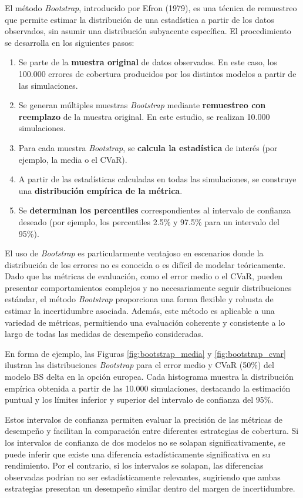 \documentclass[11pt,a4paper,spanish]{article}
\numberwithin{equation}{section} %
\begin{document}
El método \textit{Bootstrap}, introducido por Efron (1979), es una técnica de remuestreo que permite estimar la distribución de una estadística a partir de los datos observados, sin asumir una distribución subyacente específica. El procedimiento se desarrolla en los siguientes pasos:

\begin{enumerate}
    \item Se parte de la \textbf{muestra original} de datos observados. En este caso, los 100.000 errores de cobertura producidos por los distintos modelos a partir de las simulaciones. 
    \item  Se generan múltiples muestras \textit{Bootstrap} mediante \textbf{remuestreo con reemplazo} de la muestra original. En este estudio, se realizan 10.000 simulaciones.
    \item Para cada muestra \textit{Bootstrap}, se \textbf{calcula la estadística} de interés (por ejemplo, la media o el CVaR).
    \item A partir de las estadísticas calculadas en todas las simulaciones, se construye una \textbf{distribución empírica de la métrica}.
    \item Se \textbf{determinan los percentiles} correspondientes al intervalo de confianza deseado (por ejemplo, los percentiles 2.5\% y 97.5\% para un intervalo del 95\%).
\end{enumerate}

El uso de \textit{Bootstrap} es particularmente ventajoso en escenarios donde la distribución de los errores no es conocida o es difícil de modelar teóricamente. Dado que las métricas de evaluación, como el error medio o el CVaR, pueden presentar comportamientos complejos y no necesariamente seguir distribuciones estándar, el método \textit{Bootstrap} proporciona una forma flexible y robusta de estimar la incertidumbre asociada. Además, este método es aplicable a una variedad de métricas, permitiendo una evaluación coherente y consistente a lo largo de todas las medidas de desempeño consideradas.

En forma de ejemplo, las Figuras \ref{fig:bootstrap_media} y \ref{fig:bootstrap_cvar} ilustran las distribuciones \textit{Bootstrap} para el error medio y CVaR (50\%) del modelo BS delta en la opción europea. Cada histograma muestra la distribución empírica obtenida a partir de las 10.000 simulaciones, destacando la estimación puntual y los límites inferior y superior del intervalo de confianza del 95\%.

Estos intervalos de confianza permiten evaluar la precisión de las métricas de desempeño y facilitan la comparación entre diferentes estrategias de cobertura. Si los intervalos de confianza de dos modelos no se solapan significativamente, se puede inferir que existe una diferencia estadísticamente significativa en su rendimiento. Por el contrario, si los intervalos se solapan, las diferencias observadas podrían no ser estadísticamente relevantes, sugiriendo que ambas estrategias presentan un desempeño similar dentro del margen de incertidumbre.
\end{document}
